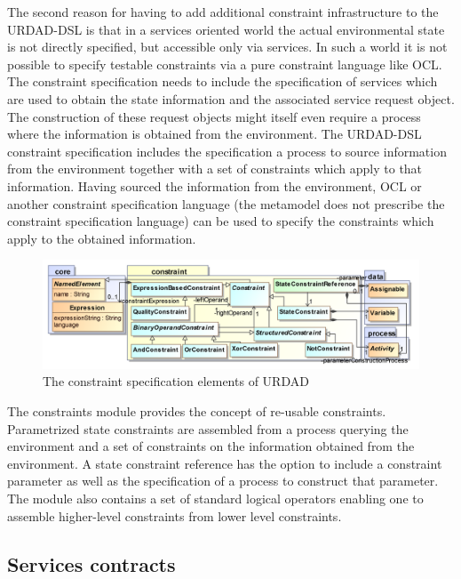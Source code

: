 The second reason for having to add additional constraint infrastructure to the URDAD-DSL is that in a services oriented world the actual environmental state is not directly specified, but accessible only via services. In such a world it is not possible to specify testable constraints via a pure constraint language like OCL. The constraint specification needs to include the specification of services which are used to obtain the state information and the associated service request object. The construction of these request objects might itself even require a process where the information is obtained from the environment. The  URDAD-DSL constraint specification includes the specification a process to source information from the environment together with a set of constraints which apply to that information. Having sourced the information from the environment, OCL or another constraint specification language (the metamodel does not prescribe the constraint specification language) can be used to specify the constraints which apply to the obtained information.

\begin{figure}[Htbp]
  \centering
  \includegraphics{constraint}
  \caption{The constraint specification elements of URDAD}
  \label{fig:metamodel}
\end{figure}

The constraints module provides the concept of re-usable constraints. Parametrized state constraints are assembled from a process querying the environment and a set of constraints on the information obtained from the environment. A state constraint reference has the option to include a constraint parameter as well as the specification of a process to construct that parameter. The module also contains a set of standard logical operators enabling one to assemble higher-level constraints from lower level constraints.


\subsection{Services contracts}

